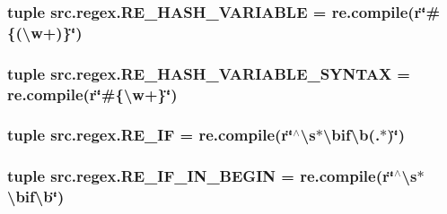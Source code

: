 \hypertarget{namespacesrc_1_1regex_a1a2d8ca724a3a99e1c0451071645fe93}{
\subsubsection[{R\-E\-\_\-\-H\-A\-S\-H\-\_\-\-V\-A\-R\-I\-A\-B\-L\-E}]{\setlength{\rightskip}{0pt plus 5cm}tuple src.\-regex.\-R\-E\-\_\-\-H\-A\-S\-H\-\_\-\-V\-A\-R\-I\-A\-B\-L\-E = re.\-compile(r\char`\"{}\#\{(\textbackslash{}w+)\}\char`\"{})}}\label{namespacesrc_1_1regex_a1a2d8ca724a3a99e1c0451071645fe93}
\hypertarget{namespacesrc_1_1regex_a09cb1b96d5583b3d9a25acce9e6fa219}{
\subsubsection[{R\-E\-\_\-\-H\-A\-S\-H\-\_\-\-V\-A\-R\-I\-A\-B\-L\-E\-\_\-\-S\-Y\-N\-T\-A\-X}]{\setlength{\rightskip}{0pt plus 5cm}tuple src.\-regex.\-R\-E\-\_\-\-H\-A\-S\-H\-\_\-\-V\-A\-R\-I\-A\-B\-L\-E\-\_\-\-S\-Y\-N\-T\-A\-X = re.\-compile(r\char`\"{}\#\{\textbackslash{}w+\}\char`\"{})}}\label{namespacesrc_1_1regex_a09cb1b96d5583b3d9a25acce9e6fa219}
\hypertarget{namespacesrc_1_1regex_a18587eb22024aa258919366da7f03cc7}{
\subsubsection[{R\-E\-\_\-\-I\-F}]{\setlength{\rightskip}{0pt plus 5cm}tuple src.\-regex.\-R\-E\-\_\-\-I\-F = re.\-compile(r\char`\"{}$^\wedge$\textbackslash{}s$\ast$\textbackslash{}bif\textbackslash{}b(.$\ast$)\char`\"{})}}\label{namespacesrc_1_1regex_a18587eb22024aa258919366da7f03cc7}
\hypertarget{namespacesrc_1_1regex_a39dadd5d54df1b7b8096e04973310006}{
\subsubsection[{R\-E\-\_\-\-I\-F\-\_\-\-I\-N\-\_\-\-B\-E\-G\-I\-N}]{\setlength{\rightskip}{0pt plus 5cm}tuple src.\-regex.\-R\-E\-\_\-\-I\-F\-\_\-\-I\-N\-\_\-\-B\-E\-G\-I\-N = re.\-compile(r\char`\"{}$^\wedge$\textbackslash{}s$\ast$\textbackslash{}bif\textbackslash{}b\char`\"{})}}\label{namespacesrc_1_1regex_a39dadd5d54df1b7b8096e04973310006}
